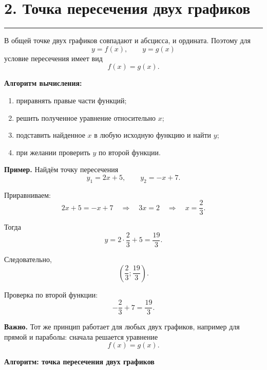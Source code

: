\documentclass[a4paper,12pt]{article}
\newcommand{\sectionline}{%
  \par\noindent
  \color{accent}\rule{\linewidth}{0.5pt}
  \color{black}\par
}
\begin{document}
\section*{2. Точка пересечения двух графиков}
\sectionline

В общей точке двух графиков совпадают и абсцисса, и ордината.
Поэтому для
\[
y=f(x),
\qquad
y=g(x)
\]
условие пересечения имеет вид
\[
\boxed{f(x)=g(x)}.
\]

\textbf{Алгоритм вычисления:}

\begin{enumerate}
  \item приравнять правые части функций;
  \item решить полученное уравнение относительно $x$;
  \item подставить найденное $x$ в любую исходную функцию и найти $y$;
  \item при желании проверить $y$ по второй функции.
\end{enumerate}

\textbf{Пример.}
Найдём точку пересечения
\[
y_1=2x+5,
\qquad
y_2=-x+7.
\]

Приравниваем:
\[
2x+5=-x+7
\quad\Longrightarrow\quad
3x=2
\quad\Longrightarrow\quad
x=\frac23.
\]

Тогда
\[
y
=
2\cdot\frac23+5
=
\frac{19}{3}.
\]

Следовательно,
\[
\boxed{\left(\frac23;\frac{19}{3}\right)}.
\]

Проверка по второй функции:
\[
-\frac23+7=\frac{19}{3}.
\]

\textbf{Важно.}
Тот же принцип работает для любых двух графиков, например для прямой и параболы:
сначала решается уравнение
\[
f(x)=g(x).
\]


\clearpage
\thispagestyle{fancy}

\begin{center}
{\Large\textcolor{darkaccent}{\textbf{Алгоритм: точка пересечения двух графиков}}}
\end{center}

\vspace{10mm}
\end{document}
